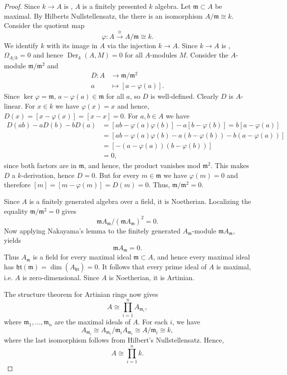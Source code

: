 \begin{proof}
	Since $k\to A$ is \etale, $A$ is a finitely presented $k$ algebra. Let $\mathfrak{m} \subset A$ be maximal.
	By Hilberts Nullstellensatz, the there is an isomorphism $A/\mathfrak{m} \cong k$. Consider the quotient map
	\[
		\varphi: A \xrightarrow{\cong} A/\mathfrak{m} \cong k.
	\]
	We identify $k$ with its image in $A$ via the injection $k\to A$.
	Since $k\to A$ is \etale, $\Omega_{A/k} = 0$ and hence $\operatorname{Der}_k(A,M) = 0$ for all $A$-modules $M$.
	Consider the $A$-module $\mathfrak{m}/\mathfrak{m}^2$ and 
	\begin{align*}
		D: A &\to \mathfrak{m}/\mathfrak{m}^2 \\
		a &\mapsto [a - \varphi(a)].
	\end{align*}
	Since $\ker\varphi = \mathfrak{m}$, $a - \varphi(a) \in \mathfrak{m}$ for all $a$, so $D$ is well-defined.
	Clearly $D$ is $A$-linear. For $x\in k$ we have $\varphi(x) = x$ and hence, $D(x) = [x - \varphi(x)] = [x - x] = 0$.
	For $a, b \in A$ we have
	\begin{align*}
		D(ab) - aD(b) - bD(a) &= [ab - \varphi(a)\varphi(b)] - a[b - \varphi(b)] = b [a - \varphi(a)] \\
		&= [ab -\varphi(a)\varphi(b) - a(b -\varphi(b)) - b(a - \varphi(a))] \\
		&= [- (a - \varphi (a))(b - \varphi(b))]	\\
		&= 0,
	\end{align*}
	since both factors are in $\mathfrak{m}$, and hence, the product vanishes mod $\mathfrak{m}^2$.
	This makes $D$ a $k$-derivation, hence $D = 0$. But for every $m\in \mathfrak{m}$ we have $\varphi(m) = 0$ and therefore $[m] = [m - \varphi(m)] = D(m) = 0$. Thus, $\mathfrak{m} / \mathfrak{m}^2 = 0$.
	
	Since $A$ is a finitely generated algebra over a field,
	it is Noetherian. Localizing the equality
	$\mathfrak m/\mathfrak m^2=0$ gives
	\[
		\mathfrak{m} A_{\mathfrak {m}} /(\mathfrak {m} A_{\mathfrak m})^2 = 0.
	\]
	Now applying Nakayama's lemma to the finitely generated
	$A_{\mathfrak m}$-module $\mathfrak m A_{\mathfrak m}$,
	yields
	\[
	\mathfrak m A_{\mathfrak m}=0.
	\]
	Thus $A_{\mathfrak m}$ is a field for every maximal
	ideal $\mathfrak m\subset A$, and hence every maximal ideal has $\mathfrak{ht}(\mathfrak{m}) = \dim(A_\mathfrak{ht}) = 0$.
	It follows that every prime ideal of $A$ is maximal, i.e. $A$ is zero-dimensional.
	Since $A$ is Noetherian, it is Artinian.
	
	The structure theorem for Artinian rings now gives
	\[
	A\cong\prod_{i=1}^{n}A_{\mathfrak m_i},
	\]
	where $\mathfrak m_1,\ldots,\mathfrak m_n$ are the
	maximal ideals of $A$.
	For each $i$, we have
	\[
	A_{\mathfrak m_i}
	\cong A_{\mathfrak m_i}/\mathfrak m_iA_{\mathfrak m_i}
	\cong A/\mathfrak m_i
	\cong k,
	\]
	where the last isomorphism follows from Hilbert's
	Nullstellensatz. Hence,
	\[
	A\cong\prod_{i=1}^{n}k.
	\]
\end{proof}

